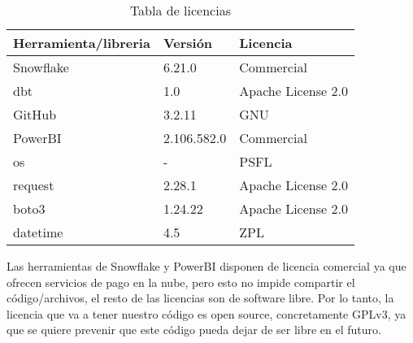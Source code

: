 \begin{table}[ht!]
    \centering
    \begin{tabular}{|l|l|l|}
    \hline
         \textbf{Herramienta/libreria}     &  \textbf{Versión}   &\textbf{Licencia} \\ \hline
         {Snowflake}       & {6.21.0}  &{Commercial} \\ \hline
         {dbt}       & {1.0}     &{Apache License 2.0} \\ \hline 
         {GitHub}       & {3.2.11}    &{GNU} \\ \hline 
         {PowerBI}       & {2.106.582.0}    &{Commercial} \\ \hline 
         {os}       & {-}    &{PSFL} \\ \hline 
         {request}       & {2.28.1}    &{Apache License 2.0} \\ \hline
         {boto3}       & {1.24.22}    &{Apache License 2.0} \\ \hline 
         {datetime}       & {4.5}    &{ZPL} \\ \hline 
    \end{tabular}
    \caption{Tabla de licencias}
    \label{tab:my_label}
\end{table}

Las herramientas de Snowflake y PowerBI disponen de licencia comercial ya que ofrecen servicios de pago en la nube, pero esto no impide compartir el código/archivos, el resto de las licencias son de software libre. Por lo tanto, la licencia que va a tener nuestro código es open source, concretamente GPLv3, ya que se quiere prevenir que este código pueda dejar de ser libre en el futuro.
